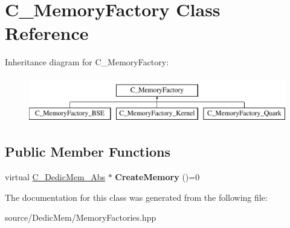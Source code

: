 \hypertarget{class_c___memory_factory}{\section{C\-\_\-\-Memory\-Factory Class Reference}
\label{class_c___memory_factory}
}
Inheritance diagram for C\-\_\-\-Memory\-Factory\-:\begin{figure}[H]
\begin{center}
\leavevmode
\includegraphics[height=2.000000cm]{class_c___memory_factory}
\end{center}
\end{figure}
\subsection*{Public Member Functions}
\begin{DoxyCompactItemize}
\item 
\hypertarget{class_c___memory_factory_a8d498d5b8573c502ae313b1c1018a098}{virtual \hyperlink{class_c___dedic_mem___abs}{C\-\_\-\-Dedic\-Mem\-\_\-\-Abs} $\ast$ {\bfseries Create\-Memory} ()=0}\label{class_c___memory_factory_a8d498d5b8573c502ae313b1c1018a098}

\end{DoxyCompactItemize}


The documentation for this class was generated from the following file\-:\begin{DoxyCompactItemize}
\item 
source/\-Dedic\-Mem/Memory\-Factories.\-hpp\end{DoxyCompactItemize}
